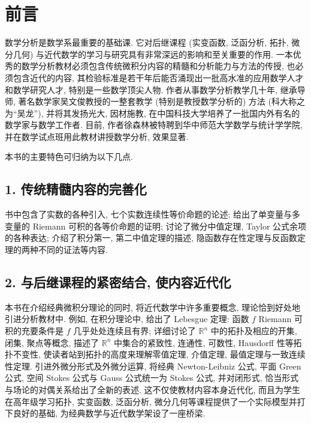 
\chapter*{前言}

数学分析是数学系最重要的基础课. 它对后继课程 (实变函数, 泛函分析, 拓扑, 微分几何) 与近代数学的学习与研究具有非常深远的影响和至关重要的作用. 一本优秀的数学分析教材必须包含传统微积分内容的精髓和分析能力与方法的传授, 也必须包含近代的内容, 其检验标准是若干年后能否涌现出一批高水准的应用数学人才和数学研究人才, 特别是一些数学顶尖人物. 作者从事数学分析教学几十年, 继承导师, 著名数学家吴文俊教授的一整套教学 (特别是教授数学分析的) 方法 (科大称之为``吴龙''), 并将其发扬光大, 因材施教, 在中国科技大学培养了一批国内外有名的数学家与数学工作者. 目前, 作者徐森林被特聘到华中师范大学数学与统计学学院, 并在数学试点班用此教材讲授数学分析, 效果显著.

本书的主要特色可归纳为以下几点.

\section*{1. 传统精髓内容的完善化}

书中包含了实数的各种引入, 七个实数连续性等价命题的论述; 给出了单变量与多变量的 Riemann 可积的各等价命题的证明; 讨论了微分中值定理, Taylor 公式余项的各种表达; 介绍了积分第一, 第二中值定理的描述, 隐函数存在性定理与反函数定理的两种不同的证法等内容.

\section*{2. 与后继课程的紧密结合, 使内容近代化}

本书在介绍经典微积分理论的同时, 将近代数学中许多重要概念, 理论恰到好处地引进分析教材中. 例如, 在积分理论中, 给出了 Lebesgue 定理: 函数 $f$ Riemann 可积的充要条件是 $f$ 几乎处处连续且有界; 详细讨论了 $\mathbb{R}^n$ 中的拓扑及相应的开集, 闭集, 聚点等概念, 描述了 $\mathbb{R}^n$ 中集合的紧致性, 连通性, 可数性, Hausdorff 性等拓扑不变性, 使读者站到拓扑的高度来理解零值定理, 介值定理, 最值定理与一致连续性定理. 引进外微分形式及外微分运算, 将经典 Newton-Leibniz 公式, 平面 Green 公式, 空间 Stokes 公式与 Gauss 公式统一为 Stokes 公式, 并对闭形式, 恰当形式与场论的对偶关系给出了全新的表述. 这不仅使教材内容本身近代化, 而且为学生在高年级学习拓扑, 实变函数, 泛函分析, 微分几何等课程提供了一个实际模型并打下良好的基础, 为经典数学与近代数学架设了一座桥梁.

